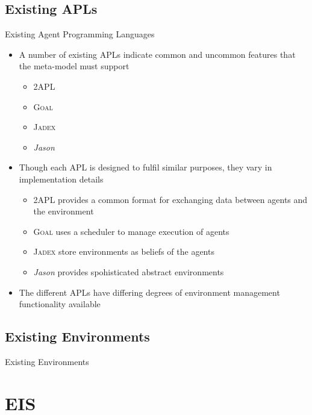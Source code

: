 \documentclass[t]{beamer}
\begin{document}
\subsection{Existing APLs}
\begin{frame}{Existing Agent Programming Languages}
	\begin{itemize}
		\item A number of existing APLs indicate common and uncommon features that the meta-model must support
		\begin{itemize}
		\item 2APL
		\item \textsc{Goal}
		\item \textsc{Jadex}
		\item \textit{Jason}
		\end{itemize}
		\item Though each APL is designed to fulfil similar purposes, they vary in implementation details
		\begin{itemize}
			\item 2APL provides a common format for exchanging data between agents and the environment
			\item \textsc{Goal} uses a scheduler to manage execution of agents
			\item \textsc{Jadex} store environments as beliefs of the agents
			\item \textit{Jason} provides spohisticated abstract environments
		\end{itemize}
		\item The different APLs have differing degrees of environment management functionality available
	\end{itemize}
\end{frame}
\subsection{Existing Environments}
\begin{frame}{Existing Environments}
\end{frame}
\section{EIS}
\end{document}

